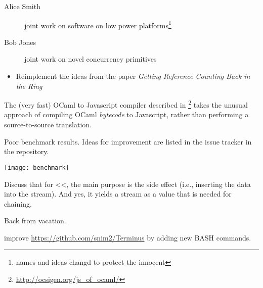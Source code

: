 \documentclass[a4paper]{tufte-handout}
\begin{document}

\begin{projects}
  \begin{description}
  \item [Alice Smith] joint work on software on low power platforms\footnote{names and ideas changd to protect the innocent}
  \item [Bob Jones] joint work on novel concurrency primitives
  \end{description}
\end{projects}


\begin{maybe}
  \begin{itemize}
  \item Reimplement the ideas from the paper \textit{Getting Reference Counting Back in the Ring} \citep{Shahriyar+12}
  \end{itemize}
\end{maybe}



The (very fast) OCaml to Javascript compiler described in \citep{VouillonBalat13}\footnote{\url{http://ocsigen.org/js_of_ocaml/}} takes the unusual approach of compiling OCaml \textit{bytecode} to Javascript, rather than performing a source-to-source translation.

\hrulefill



Poor benchmark results. Ideas for improvement are listed in the issue tracker in the repository.

\texttt{[image: benchmark]}

\hrulefill


Discuss that for <<, the main purpose is the side effect (i.e., inserting the data into the stream). And yes, it yields a stream as a value that is needed for chaining.

Back from vacation.

 improve \url{https://github.com/snim2/Terminus} by adding new BASH commands.
\end{document}
